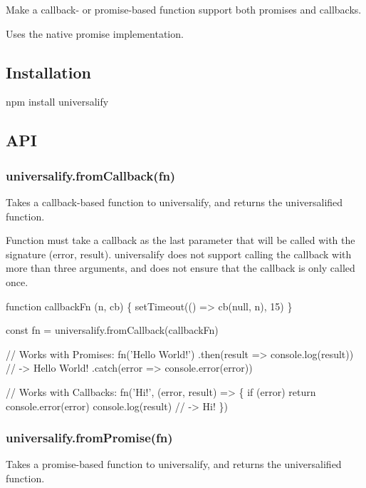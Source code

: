\href{https://travis-ci.org/RyanZim/universalify}{\tt }   

Make a callback-\/ or promise-\/based function support both promises and callbacks.

Uses the native promise implementation.

\subsection*{Installation}


\begin{DoxyCode}
npm install universalify
\end{DoxyCode}


\subsection*{A\+PI}

\subsubsection*{{\ttfamily universalify.\+from\+Callback(fn)}}

Takes a callback-\/based function to universalify, and returns the universalified function.

Function must take a callback as the last parameter that will be called with the signature {\ttfamily (error, result)}. {\ttfamily universalify} does not support calling the callback with more than three arguments, and does not ensure that the callback is only called once.


\begin{DoxyCode}
function callbackFn (n, cb) \{
  setTimeout(() => cb(null, n), 15)
\}

const fn = universalify.fromCallback(callbackFn)

// Works with Promises:
fn('Hello World!')
.then(result => console.log(result)) // -> Hello World!
.catch(error => console.error(error))

// Works with Callbacks:
fn('Hi!', (error, result) => \{
  if (error) return console.error(error)
  console.log(result)
  // -> Hi!
\})
\end{DoxyCode}


\subsubsection*{{\ttfamily universalify.\+from\+Promise(fn)}}

Takes a promise-\/based function to universalify, and returns the universalified function.

